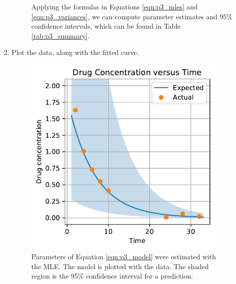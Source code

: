 \documentclass[letterpaper,11pt]{article}
\begin{document}
\begin{enumerate}
\begin{enumerate}
\begin{description}
      Applying the formulas in Equations \ref{eqn:p3_mles} and
      \ref{eqn:p3_variances}, we can compute parameter estimates and 95\%
      confidence intervals, which can be found in Table \ref{tab:p3_summary}.
    \end{description}    
  \item Plot the data, along with the fitted curve.
    \begin{figure}
      \centering
      \includegraphics{p3_fitted_curve.pdf}
      \caption{Parameters of Equation \ref{eqn:p3_model} were estimated with the
        MLE. The model is plotted with the data. The shaded region is the 95\%
        confidence interval for a prediction.}
      \label{fig:p3_fitted}
    \end{figure}


\end{enumerate}
\end{enumerate}
\end{document}
